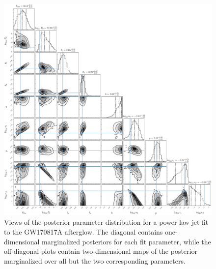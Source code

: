 \documentclass[twocolumn]{aastex62}
\newcommand{\gwbns}{GW170817A}
\begin{document}
\begin{figure}
	\includegraphics[width=\textwidth]{figs/cornerPowerlaw.pdf}
	\caption{Views of the posterior parameter distribution for a power law jet fit to the \gwbns{} afterglow.  The diagonal contains one-dimensional marginalized posteriors for each fit parameter, while the off-diagonal plots contain two-dimensional maps of the posterior marginalized over all but the two corresponding parameters. \label{fig:cornerPowerlaw}}
\end{figure}


\end{document}
